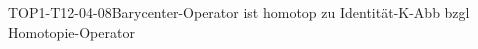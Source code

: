 
\begin{PROP}{TOP1-T12-04-08}{Barycenter-Operator ist homotop zu Identität-K-Abb bzgl Homotopie-Operator}
\end{PROP}
